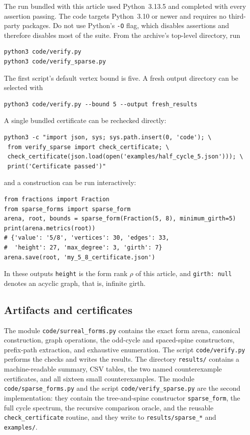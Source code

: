 \documentclass[11pt,a4paper]{article}
\numberwithin{equation}{section}
\theoremstyle{definition}
\theoremstyle{remark}
\newcommand{\rk}{\rho}
\newcommand{\code}[1]{\texttt{#1}}
\begin{document}
The run bundled with this article used Python~3.13.5 and completed with every
assertion passing. The code targets Python~3.10 or newer and requires no
third-party packages. Do not use Python's \code{-O} flag, which disables
assertions and therefore disables most of the suite. From the archive's
top-level directory, run
\begin{lstlisting}
python3 code/verify.py
python3 code/verify_sparse.py
\end{lstlisting}
The first script's default vertex bound is five. A fresh output directory can be
selected with
\begin{lstlisting}
python3 code/verify.py --bound 5 --output fresh_results
\end{lstlisting}
A single bundled certificate can be rechecked directly:
\begin{lstlisting}
python3 -c "import json, sys; sys.path.insert(0, 'code'); \
 from verify_sparse import check_certificate; \
 check_certificate(json.load(open('examples/half_cycle_5.json'))); \
 print('Certificate passed')"
\end{lstlisting}
and a construction can be run interactively:
\begin{lstlisting}
from fractions import Fraction
from sparse_forms import sparse_form
arena, root, bounds = sparse_form(Fraction(5, 8), minimum_girth=5)
print(arena.metrics(root))
# {'value': '5/8', 'vertices': 30, 'edges': 33,
#  'height': 27, 'max_degree': 3, 'girth': 7}
arena.save(root, 'my_5_8_certificate.json')
\end{lstlisting}
In these outputs \code{height} is the form rank $\rk$ of this article, and
\code{girth: null} denotes an acyclic graph, that is, infinite girth.

\subsection{Artifacts and certificates}

The module \code{code/surreal\_forms.py} contains the exact form arena,
canonical construction, graph operations, the odd-cycle and spaced-spine
constructors, prefix-path extraction, and exhaustive enumeration. The script
\code{code/verify.py} performs the checks and writes the results. The directory
\code{results/} contains a machine-readable summary, CSV tables, the two named
counterexample certificates, and all sixteen small counterexamples. The module
\code{code/sparse\_forms.py} and the script \code{code/verify\_sparse.py} are
the second implementation: they contain the tree-and-spine constructor
\code{sparse\_form}, the full cycle spectrum, the recursive comparison oracle,
and the reusable \code{check\_certificate} routine, and they write to
\code{results/sparse\_*} and \code{examples/}.
\end{document}
